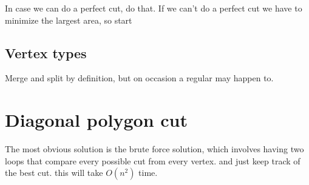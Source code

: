 \documentclass{article}
\begin{document}
In case we can do a perfect cut, do that.
If we can't do a perfect cut we have to minimize the largest area,
so start

\subsection{Vertex types}
Merge and split by definition, but on occasion a regular may happen to.
\section{Diagonal polygon cut}
The most obvious solution is the brute force solution, which involves
having two loops that compare every possible cut from every vertex.
and just keep track of the best cut. this will take $O(n^2)$ time.
\end{document}
